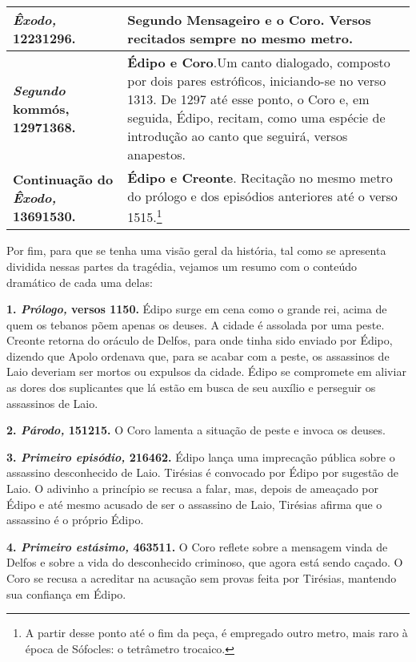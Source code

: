 \begin{tabular}[c]{|p{}|p{}|}
    \textbf{\emph{Êxodo,} 12231296.}                         & \textbf{Segundo Mensageiro e o Coro}. Versos recitados sempre no mesmo metro. \\ \hline
    \textbf{\emph{Segundo} kommós, 12971368.}                & \textbf{Édipo e Coro}.Um canto dialogado, composto por dois pares estróficos, iniciando-se no verso 1313. De 1297 até esse ponto, o Coro e, em seguida, Édipo, recitam, como uma espécie de introdução ao canto que seguirá, versos anapestos. \\ \hline
    \textbf{Continuação do \emph{Êxodo,} 13691530.}          & \textbf{Édipo e Creonte}. Recitação no mesmo metro do prólogo e dos episódios anteriores até o verso 1515.\footnote{A partir desse ponto até o fim da peça, é empregado outro metro, mais raro à época de Sófocles: o tetrâmetro trocaico.} \\ \hline
    \end{tabular}
    



Por fim, para que se tenha uma visão geral da história, tal como se
apresenta dividida nessas partes da tragédia, vejamos um resumo com o
conteúdo dramático de cada uma delas:

\textbf{1. \emph{Prólogo,} versos 1150.} Édipo surge em cena como o
grande rei, acima de quem os tebanos põem apenas os deuses. A cidade é
assolada por uma peste. Creonte retorna do oráculo de Delfos, para onde
tinha sido enviado por Édipo, dizendo que Apolo ordenava que, para se
acabar com a peste, os assassinos de Laio deveriam ser mortos ou
expulsos da cidade. Édipo se compromete em aliviar as dores dos
suplicantes que lá estão em busca de seu auxílio e perseguir os
assassinos de Laio.

\textbf{2. \emph{Párodo,} 151215.} O Coro lamenta a situação
de peste e invoca os deuses.

\textbf{3. \emph{Primeiro episódio,} 216462.} Édipo lança uma
imprecação pública sobre o assassino desconhecido de Laio. Tirésias é
convocado por Édipo por sugestão de Laio. O adivinho a princípio se
recusa a falar, mas, depois de ameaçado por Édipo e até mesmo acusado de
ser o assassino de Laio, Tirésias afirma que o assassino é o próprio
Édipo.

\textbf{4. \emph{Primeiro estásimo,} 463511.} O Coro reflete sobre a
mensagem vinda de Delfos e sobre a vida do desconhecido criminoso, que
agora está sendo caçado. O Coro se recusa a acreditar na acusação sem
provas feita por Tirésias, mantendo sua confiança em Édipo.

